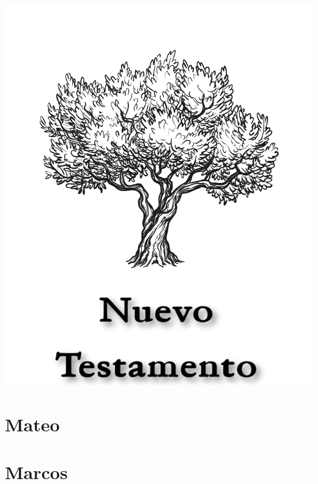 \null\vfill
\begin{center}
\begin{minipage}[c]{\textwidth}
  \begin{center}
  \includegraphics{NuevoTestamentoTitulo.pdf}
  \end{center}
\end{minipage}
\end{center}
\null\vfill
\newpage

\pagestyle{bible}

\chapter{Mateo}
\begin{multicols}{2}
  \raggedcolumns
  \parskip=0pt \relax
  
\end{multicols}

\chapter{Marcos}
\begin{multicols}{2}
  \raggedcolumns
  \parskip=0pt \relax
  
\end{multicols}

